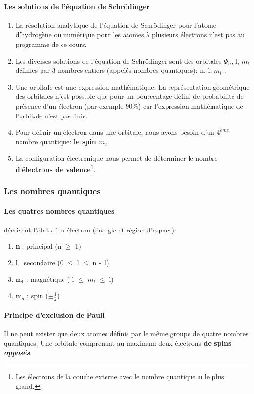 \documentclass[10pt,a4paper]{book}
\begin{document}
\paragraph{Les solutions de l'équation de Schrödinger}
\begin{enumerate}
\item La résolution analytique de l'équation de Schrödinger pour l'atome d'hydrogène ou numérique pour les atomes à plusieurs électrons n'est pas au programme de ce cours.
\item Les diverses solutions de l'équation de Schrödinger sont des orbitales $\Psi_n$, l, $m_l$ définies par 3 nombres entiers (appelés nombres quantiques): n, l, $m_l$ .
\item Une orbitale est une expression mathématique. La représentation géométrique des orbitales n'est possible que pour un pourcentage défini de probabilité de présence d'un électron (par exemple 90\%) car l'expression mathématique de l'orbitale n'est pas finie.
\item  Pour définir un électron dans une orbitale, nous avons besoin d'un $4^{\grave{e}me}$ nombre quantique: \textbf{le spin $m_s$}. \label{spin}
\item  La configuration électronique nous permet de déterminer le nombre \textbf{d'électrons de valence}\footnote{Les électrons de la couche externe avec le nombre quantique \textbf{n} le plus grand.}.
\end{enumerate}

\subsubsection{Les nombres quantiques}

\paragraph{Les quatres nombres quantiques} décrivent l'état d'un électron (énergie et région d'espace):
\begin{enumerate}
\item \textbf{n} : principal (n $\geq$ 1)
\item \textbf{l} : secondaire (0 $\leq$ l $\leq$ n - 1) 
\item $\mathbf{m_l}$ : magnétique (-l $\leq$ $m_l$ $\leq$ l)
\item $\mathbf{m_s}$ : spin ($\pm \frac{1}{2}$)
\end{enumerate}
\paragraph{Principe d'exclusion de Pauli} Il ne peut exister que deux atomes définis par le même groupe de quatre nombres quantiques. Une orbitale comprenant au maximum deux électrons \textbf{de spins \textit{opposés}} \label{eq:1}
\end{document}
